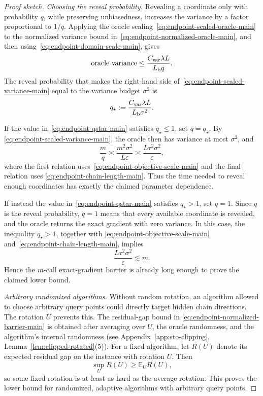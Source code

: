 \documentclass[11pt]{article}
\newcommand{\E}{\mathbb{E}}
\begin{document}
\begin{proof}[Proof sketch]
\emph{Choosing the reveal probability.}
Revealing a coordinate only with probability \(q\), while preserving unbiasedness, increases the variance by a factor
proportional to \(1/q\). Applying the oracle scaling~\eqref{eq:endpoint-scaled-oracle-main} to the normalized variance
bound in~\eqref{eq:endpoint-normalized-oracle-main}, and then using~\eqref{eq:endpoint-domain-scale-main}, gives
\begin{equation}
\label{eq:endpoint-scaled-variance-main}
\text{oracle variance}
\le
\frac{C_{\rm var}\lambda L}{L_{\rm b}q}.
\end{equation}
The reveal probability that makes the right-hand side of~\eqref{eq:endpoint-scaled-variance-main} equal to the
variance budget \(\sigma^2\) is
\begin{equation}
\label{eq:endpoint-qstar-main}
q_\star:=\frac{C_{\rm var}\lambda L}{L_{\rm b}\sigma^2}.
\end{equation}

If the value in~\eqref{eq:endpoint-qstar-main} satisfies \(q_\star\le1\), set \(q=q_\star\). By
\eqref{eq:endpoint-scaled-variance-main}, the oracle then has variance at most \(\sigma^2\), and
\[
\frac{m}{q}
\asymp
\frac{m^2\sigma^2}{L\varepsilon}
\asymp
\frac{L\tau^2\sigma^2}{\varepsilon},
\]
where the first relation uses~\eqref{eq:endpoint-objective-scale-main} and the final relation uses
\eqref{eq:endpoint-chain-length-main}. Thus the time needed to reveal enough coordinates has exactly the claimed
parameter dependence.

If instead the value in~\eqref{eq:endpoint-qstar-main} satisfies \(q_\star>1\), set \(q=1\). Since \(q\) is the
reveal probability, \(q=1\) means that every available coordinate is revealed, and the oracle returns the exact
gradient with zero variance. In this case, the inequality \(q_\star>1\), together with
\eqref{eq:endpoint-objective-scale-main} and~\eqref{eq:endpoint-chain-length-main}, implies
\[
\frac{L\tau^2\sigma^2}{\varepsilon}\lesssim m.
\]
Hence the \(m\)-call exact-gradient barrier is already long enough to prove the claimed lower bound.

\emph{Arbitrary randomized algorithms.}
Without random rotation, an algorithm allowed to choose arbitrary query points could directly target hidden chain
directions. The rotation \(U\) prevents this. The residual-gap bound in
\eqref{eq:endpoint-normalized-barrier-main} is obtained after averaging over \(U\), the oracle randomness, and the
algorithm's internal randomness (see Appendix~\ref{app:sto-clipping}, Lemma~\ref{lem:clipped-rotated}(5)). For a fixed
algorithm, let \(R(U)\) denote its expected residual gap on the instance with rotation \(U\). Then
\[
\sup_U R(U)\ge\E_U R(U),
\]
so some fixed rotation is at least as hard as the average rotation. This proves the lower bound for randomized,
adaptive algorithms with arbitrary query points.


\end{proof}
\end{document}
